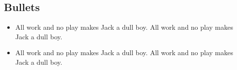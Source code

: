 
%
%

%
%

\subsection{Bullets}
\label{sec:discussion_bullets}

\begin{itemize}

\item All work and no play makes Jack a dull boy.
All work and no play makes Jack a dull boy.

\item All work and no play makes Jack a dull boy.
All work and no play makes Jack a dull boy.

\end{itemize}
